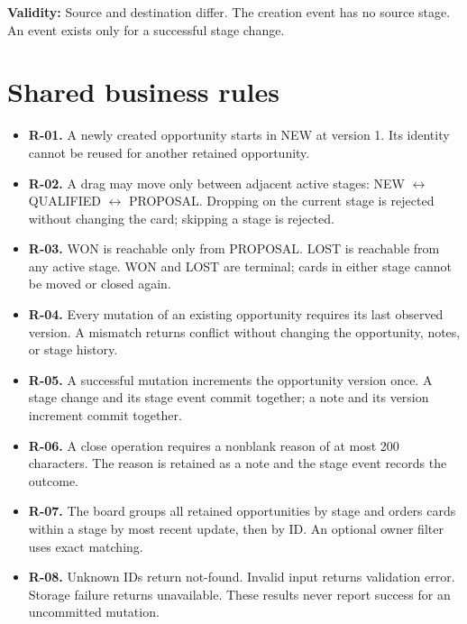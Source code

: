 \documentclass[10pt,a4paper]{article}
\begin{document}
\textbf{Validity:} Source and destination differ. The creation event has no source stage. An event exists only for a successful stage change.

\section{Shared business rules}

\begin{itemize}

\item \textbf{R-01.} A newly created opportunity starts in NEW at version 1. Its identity cannot be reused for another retained opportunity.

\item \textbf{R-02.} A drag may move only between adjacent active stages: NEW \(\leftrightarrow\) QUALIFIED \(\leftrightarrow\) PROPOSAL. Dropping on the current stage is rejected without changing the card; skipping a stage is rejected.

\item \textbf{R-03.} WON is reachable only from PROPOSAL. LOST is reachable from any active stage. WON and LOST are terminal; cards in either stage cannot be moved or closed again.

\item \textbf{R-04.} Every mutation of an existing opportunity requires its last observed version. A mismatch returns conflict without changing the opportunity, notes, or stage history.

\item \textbf{R-05.} A successful mutation increments the opportunity version once. A stage change and its stage event commit together; a note and its version increment commit together.

\item \textbf{R-06.} A close operation requires a nonblank reason of at most 200 characters. The reason is retained as a note and the stage event records the outcome.

\item \textbf{R-07.} The board groups all retained opportunities by stage and orders cards within a stage by most recent update, then by ID. An optional owner filter uses exact matching.

\item \textbf{R-08.} Unknown IDs return not-found. Invalid input returns validation error. Storage failure returns unavailable. These results never report success for an uncommitted mutation.

\end{itemize}
\end{document}
